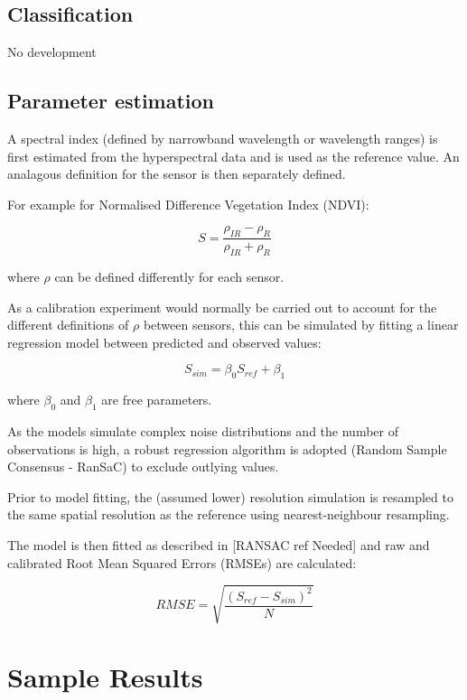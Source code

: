 \documentclass[10pt,a4paper,final,twocolumn]{article}
\begin{document}
\subsection{Classification}
No development

\subsection{Parameter estimation}
A spectral index (defined by narrowband wavelength or wavelength ranges) is first estimated from the hyperspectral data and is used as the reference value. An analagous definition for the sensor is then separately defined.

For example for Normalised Difference Vegetation Index (NDVI):

\begin{equation}
S = \frac{\rho_{IR} - \rho_{R}}{\rho_{IR} + \rho_{R}}
\end{equation}

where $\rho$ can be defined differently for each sensor.

As a calibration experiment would normally be carried out to account for the different definitions of $\rho$ between sensors, this can be simulated by fitting a linear regression model between predicted and observed values:

\begin{equation}
S_{sim} = \beta_{0} S_{ref} + \beta_1
\end{equation}

where $\beta_0$ and $\beta_1$ are free parameters.

As the models simulate complex noise distributions and the number of observations is high, a robust regression algorithm is adopted (Random Sample Consensus - RanSaC) to exclude outlying values.

Prior to model fitting, the (assumed lower) resolution simulation is resampled to the same spatial resolution as the reference using nearest-neighbour resampling.

The model is then fitted as described in [RANSAC ref Needed] and raw and calibrated Root Mean Squared Errors (RMSEs) are calculated:

\begin{equation}
RMSE = \sqrt{\frac{(S_{ref}-S_{sim})^{2}}{N}}
\end{equation}

\section{Sample Results}
\end{document}
